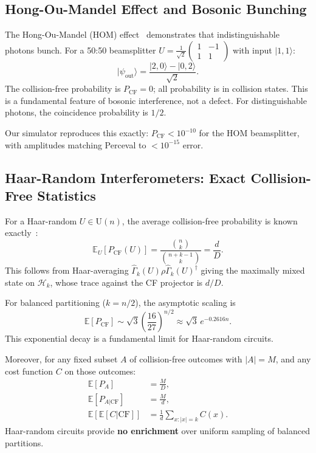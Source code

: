 \subsection{Hong-Ou-Mandel Effect and Bosonic Bunching}

The Hong-Ou-Mandel (HOM) effect~\cite{hong1987measurement} demonstrates that indistinguishable photons bunch. For a 50:50 beamsplitter $U = \frac{1}{\sqrt{2}}\begin{pmatrix} 1 & -1 \\ 1 & 1 \end{pmatrix}$ with input $|1,1\rangle$:
\begin{equation}
|\psi_{\mathrm{out}}\rangle = \frac{|2,0\rangle - |0,2\rangle}{\sqrt{2}}.
\end{equation}
The collision-free probability is $P_{\mathrm{CF}} = 0$; all probability is in collision states. This is a fundamental feature of bosonic interference, not a defect. For distinguishable photons, the coincidence probability is $1/2$.

Our simulator reproduces this exactly: $P_{\mathrm{CF}} < 10^{-10}$ for the HOM beamsplitter, with amplitudes matching Perceval to $< 10^{-15}$ error.

\subsection{Haar-Random Interferometers: Exact Collision-Free Statistics}

For a Haar-random $U \in \mathrm{U}(n)$, the average collision-free probability is known exactly~\cite{arkhipov2012bosonic}:
\begin{equation}
\label{eq:haar_pcf}
\mathbb{E}_U[P_{\mathrm{CF}}(U)] = \frac{\binom{n}{k}}{\binom{n+k-1}{k}} = \frac{d}{D}.
\end{equation}
This follows from Haar-averaging $\hat{\Gamma}_k(U) \rho \hat{\Gamma}_k(U)^\dagger$ giving the maximally mixed state on $\mathcal{H}_k$, whose trace against the CF projector is $d/D$.

For balanced partitioning ($k=n/2$), the asymptotic scaling is
\begin{equation}
\label{eq:haar_asymptotic}
\mathbb{E}[P_{\mathrm{CF}}] \sim \sqrt{3} \left(\frac{16}{27}\right)^{n/2} \approx \sqrt{3} \, e^{-0.2616 n}.
\end{equation}
This exponential decay is a fundamental limit for Haar-random circuits.

Moreover, for any fixed subset $A$ of collision-free outcomes with $|A|=M$, and any cost function $C$ on those outcomes:
\begin{align}
\mathbb{E}[P_A] &= \frac{M}{D}, \\
\mathbb{E}[P_{A|\mathrm{CF}}] &= \frac{M}{d}, \\
\mathbb{E}[\mathbb{E}[C|\mathrm{CF}]] &= \frac{1}{d}\sum_{x: |x|=k} C(x).
\end{align}
Haar-random circuits provide \textbf{no enrichment} over uniform sampling of balanced partitions.

